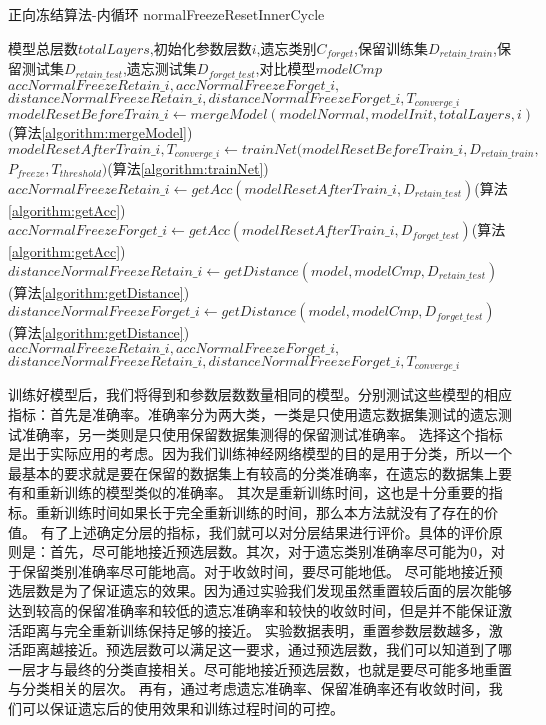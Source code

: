 \begin{algorithm}
	\renewcommand{\algorithmicrequire}{\textbf{Input:}}
	\renewcommand{\algorithmicensure}{\textbf{Output:}}
	\caption{正向冻结算法-内循环 normalFreezeResetInnerCycle}
	\label{algorithm:normalFreezeResetInnerCycle}
	\begin{algorithmic}[1]
        \REQUIRE 模型总层数$totalLayers$,初始化参数层数$i$,遗忘类别$C_{forget}$,保留训练集$D_{retain\_train}$,保留测试集$D_{retain\_test}$,遗忘测试集$D_{forget\_test}$,对比模型$modelCmp$
        \ENSURE  $accNormalFreezeRetain\_i,accNormalFreezeForget\_i,$\\$distanceNormalFreezeRetain\_i,distanceNormalFreezeForget\_i,T_{converge\_i}$
		\STATE $modelResetBeforeTrain\_i \gets mergeModel(modelNormal, modelInit, totalLayers, i)$(算法\ref{algorithm:mergeModel})
        \STATE $modelResetAfterTrain\_i,T_{converge\_i} \gets trainNet(modelResetBeforeTrain\_i , D_{retain\_train},$\\$ P_{freeze}, T_{threshold})$(算法\ref{algorithm:trainNet})
        \STATE $accNormalFreezeRetain\_i \gets getAcc(modelResetAfterTrain\_i, D_{retain\_test})$(算法\ref{algorithm:getAcc})
        \STATE $accNormalFreezeForget\_i  \gets getAcc(modelResetAfterTrain\_i, D_{forget\_test})$(算法\ref{algorithm:getAcc})
        \STATE $distanceNormalFreezeRetain\_i \gets getDistance(model, modelCmp, D_{retain\_test})$(算法\ref{algorithm:getDistance})
        \STATE $distanceNormalFreezeForget\_i \gets getDistance(model, modelCmp, D_{forget\_test})$(算法\ref{algorithm:getDistance})
        \RETURN $accNormalFreezeRetain\_i,accNormalFreezeForget\_i,$\\$distanceNormalFreezeRetain\_i,distanceNormalFreezeForget\_i,T_{converge\_i}$
	\end{algorithmic}  
\end{algorithm}

训练好模型后，我们将得到和参数层数数量相同的模型。分别测试这些模型的相应指标：首先是准确率。准确率分为两大类，一类是只使用遗忘数据集测试的遗忘测试准确率，另一类则是只使用保留数据集测得的保留测试准确率。
选择这个指标是出于实际应用的考虑。因为我们训练神经网络模型的目的是用于分类，所以一个最基本的要求就是要在保留的数据集上有较高的分类准确率，在遗忘的数据集上要有和重新训练的模型类似的准确率。
其次是重新训练时间，这也是十分重要的指标。重新训练时间如果长于完全重新训练的时间，那么本方法就没有了存在的价值。
有了上述确定分层的指标，我们就可以对分层结果进行评价。具体的评价原则是：首先，尽可能地接近预选层数。其次，对于遗忘类别准确率尽可能为0，对于保留类别准确率尽可能地高。对于收敛时间，要尽可能地低。
尽可能地接近预选层数是为了保证遗忘的效果。因为通过实验我们发现虽然重置较后面的层次能够达到较高的保留准确率和较低的遗忘准确率和较快的收敛时间，但是并不能保证激活距离与完全重新训练保持足够的接近。
实验数据表明，重置参数层数越多，激活距离越接近。预选层数可以满足这一要求，通过预选层数，我们可以知道到了哪一层才与最终的分类直接相关。尽可能地接近预选层数，也就是要尽可能多地重置与分类相关的层次。
再有，通过考虑遗忘准确率、保留准确率还有收敛时间，我们可以保证遗忘后的使用效果和训练过程时间的可控。

